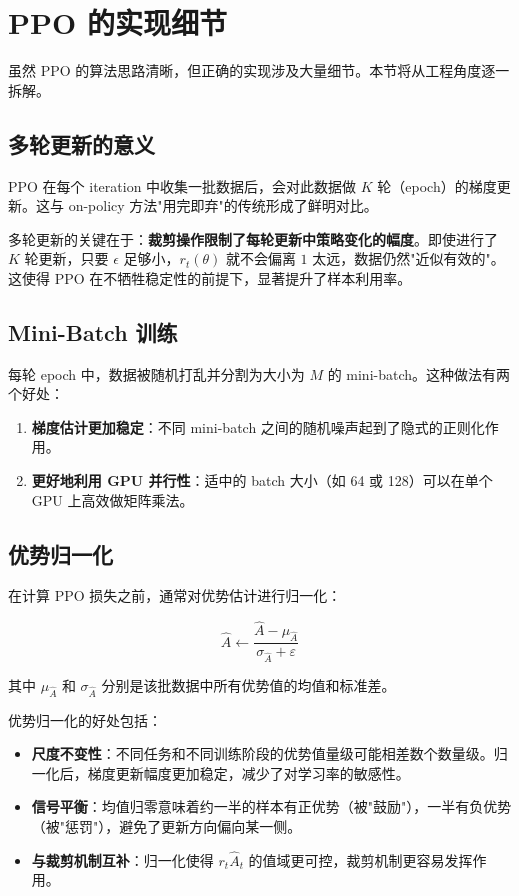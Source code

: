 \section{PPO 的实现细节}

虽然 PPO 的算法思路清晰，但正确的实现涉及大量细节。本节将从工程角度逐一拆解。

\subsection{多轮更新的意义}

PPO 在每个 iteration 中收集一批数据后，会对此数据做 $K$ 轮（epoch）的梯度更新。这与 on-policy 方法"用完即弃"的传统形成了鲜明对比。

多轮更新的关键在于：\textbf{裁剪操作限制了每轮更新中策略变化的幅度}。即使进行了 $K$ 轮更新，只要 $\epsilon$ 足够小，$r_t(\theta)$ 就不会偏离 $1$ 太远，数据仍然"近似有效的"。这使得 PPO 在不牺牲稳定性的前提下，显著提升了样本利用率。

\subsection{Mini-Batch 训练}

每轮 epoch 中，数据被随机打乱并分割为大小为 $M$ 的 mini-batch。这种做法有两个好处：

\begin{enumerate}
    \item \textbf{梯度估计更加稳定}：不同 mini-batch 之间的随机噪声起到了隐式的正则化作用。
    \item \textbf{更好地利用 GPU 并行性}：适中的 batch 大小（如 64 或 128）可以在单个 GPU 上高效做矩阵乘法。
\end{enumerate}

\subsection{优势归一化}

在计算 PPO 损失之前，通常对优势估计进行归一化：

\[
\hat{A} \leftarrow \frac{\hat{A} - \mu_{\hat{A}}}{\sigma_{\hat{A}} + \varepsilon}
\]

其中 $\mu_{\hat{A}}$ 和 $\sigma_{\hat{A}}$ 分别是该批数据中所有优势值的均值和标准差。

优势归一化的好处包括：

\begin{itemize}
    \item \textbf{尺度不变性}：不同任务和不同训练阶段的优势值量级可能相差数个数量级。归一化后，梯度更新幅度更加稳定，减少了对学习率的敏感性。
    \item \textbf{信号平衡}：均值归零意味着约一半的样本有正优势（被"鼓励"），一半有负优势（被"惩罚"），避免了更新方向偏向某一侧。
    \item \textbf{与裁剪机制互补}：归一化使得 $r_t \hat{A}_t$ 的值域更可控，裁剪机制更容易发挥作用。
\end{itemize}

